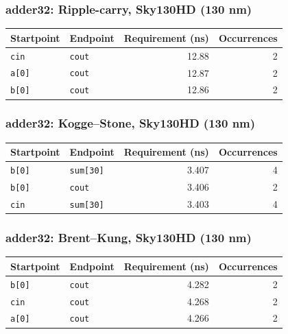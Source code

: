 \documentclass[10pt,letterpaper]{article}
\begin{document}
\subsubsection{adder32: Ripple-carry, Sky130HD (130 nm)}

\begin{tabularx}{\linewidth}{XXrr}\toprule Startpoint & Endpoint & Requirement (ns) & Occurrences \\ \midrule

\nolinkurl{cin} & \nolinkurl{cout} & 12.88 & 2 \\

\nolinkurl{a[0]} & \nolinkurl{cout} & 12.87 & 2 \\

\nolinkurl{b[0]} & \nolinkurl{cout} & 12.86 & 2 \\

\bottomrule\end{tabularx}

\subsubsection{adder32: Kogge--Stone, Sky130HD (130 nm)}

\begin{tabularx}{\linewidth}{XXrr}\toprule Startpoint & Endpoint & Requirement (ns) & Occurrences \\ \midrule

\nolinkurl{b[0]} & \nolinkurl{sum[30]} & 3.407 & 4 \\

\nolinkurl{b[0]} & \nolinkurl{cout} & 3.406 & 2 \\

\nolinkurl{cin} & \nolinkurl{sum[30]} & 3.403 & 4 \\

\bottomrule\end{tabularx}

\subsubsection{adder32: Brent--Kung, Sky130HD (130 nm)}

\begin{tabularx}{\linewidth}{XXrr}\toprule Startpoint & Endpoint & Requirement (ns) & Occurrences \\ \midrule

\nolinkurl{b[0]} & \nolinkurl{cout} & 4.282 & 2 \\

\nolinkurl{cin} & \nolinkurl{cout} & 4.268 & 2 \\

\nolinkurl{a[0]} & \nolinkurl{cout} & 4.266 & 2 \\

\bottomrule\end{tabularx}
\end{document}
